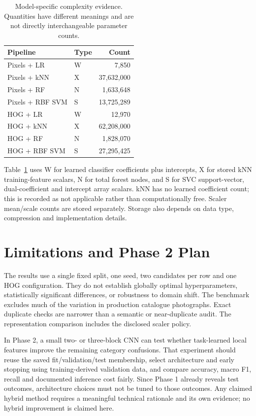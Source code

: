 \documentclass[conference]{IEEEtran}
\begin{document}
\begin{table}[t]
\caption{Model-specific complexity evidence. Quantities have different meanings
and are not directly interchangeable parameter counts.}
\label{tab:complexity}\centering\small
\begin{tabular}{llr}\toprule
Pipeline & Type & Count\\\midrule
Pixels + LR & W & 7,850 \\
Pixels + kNN & X & 37,632,000 \\
Pixels + RF & N & 1,633,648 \\
Pixels + RBF SVM & S & 13,725,289 \\
HOG + LR & W & 12,970 \\
HOG + kNN & X & 62,208,000 \\
HOG + RF & N & 1,828,070 \\
HOG + RBF SVM & S & 27,295,425 \\
\bottomrule\end{tabular}
\end{table}

Table~\ref{tab:complexity} uses W for learned classifier coefficients plus
intercepts, X for stored kNN training-feature scalars, N for total forest nodes,
and S for SVC support-vector, dual-coefficient and intercept array scalars.
kNN has no learned coefficient count; this is recorded as not applicable rather
than computationally free. Scaler mean/scale counts are stored separately.
Storage also depends on data type, compression and implementation details.

\section{Limitations and Phase 2 Plan}
The results use a single fixed split, one seed, two candidates per row and one
HOG configuration. They do not establish globally optimal hyperparameters,
statistically significant differences, or robustness to domain shift. The
benchmark excludes much of the variation in production catalogue photographs.
Exact duplicate checks are narrower than a semantic or near-duplicate audit.
The representation comparison includes the disclosed scaler policy.

In Phase 2, a small two- or three-block CNN can test whether task-learned local
features improve the remaining category confusions. That experiment should
reuse the saved fit/validation/test membership, select architecture and early
stopping using training-derived validation data, and compare accuracy, macro
F1, recall and documented inference cost fairly. Since Phase 1 already reveals
test outcomes, architecture choices must not be tuned to those outcomes.
Any claimed hybrid method requires a meaningful technical rationale and its
own evidence; no hybrid improvement is claimed here.
\end{document}
